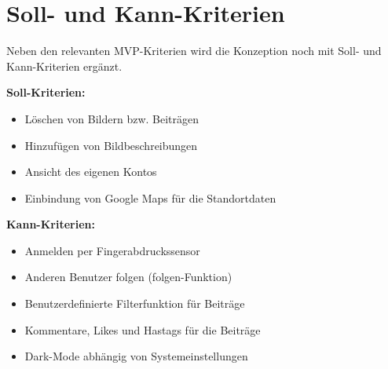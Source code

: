 \section{Soll- und Kann-Kriterien\label{sec2.3:Unterpunkt-3}}

Neben den relevanten MVP-Kriterien wird die Konzeption noch mit Soll- und Kann-Kriterien ergänzt.

\textbf{Soll-Kriterien:}

\begin{itemize}
    \item Löschen von Bildern bzw. Beiträgen
    \item Hinzufügen von Bildbeschreibungen
    \item Ansicht des eigenen Kontos
    \item Einbindung von Google Maps für die Standortdaten
\end{itemize}

\textbf{Kann-Kriterien:}

\begin{itemize}
    \item Anmelden per Fingerabdruckssensor
    \item Anderen Benutzer \glqq folgen\grqq{} (\glqq folgen\grqq{}-Funktion)
    \item Benutzerdefinierte Filterfunktion für Beiträge
    \item Kommentare, Likes und Hastags für die Beiträge
    \item Dark-Mode abhängig von Systemeinstellungen
\end{itemize}